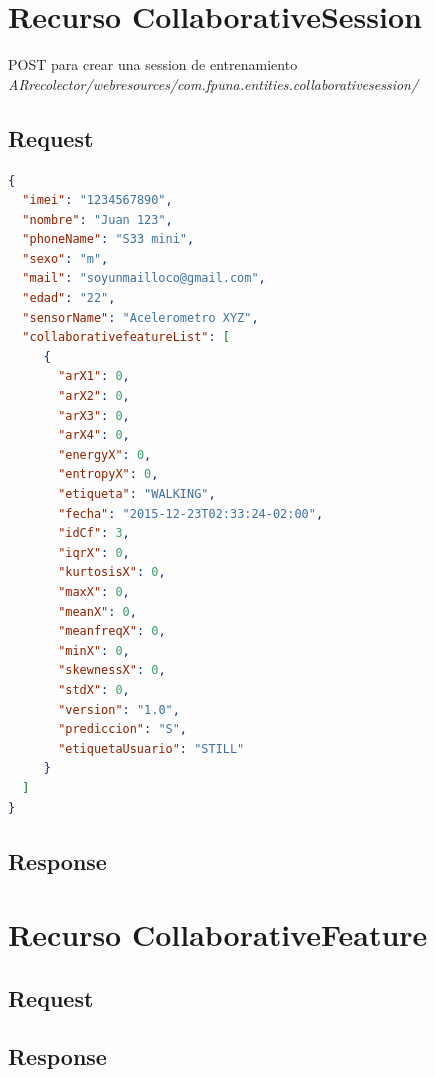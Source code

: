 \section{Recurso CollaborativeSession}

POST para crear una session de entrenamiento \textit{ARrecolector/webresources/com.fpuna.entities.collaborativesession/}

\subsection{Request}

\begin{lstlisting}[language=json,firstnumber=1]
{
  "imei": "1234567890",
  "nombre": "Juan 123",
  "phoneName": "S33 mini",
  "sexo": "m",
  "mail": "soyunmailloco@gmail.com",
  "edad": "22",
  "sensorName": "Acelerometro XYZ",
  "collaborativefeatureList": [
     {
       "arX1": 0,
       "arX2": 0,
       "arX3": 0,
       "arX4": 0,
       "energyX": 0,
       "entropyX": 0,
       "etiqueta": "WALKING",
       "fecha": "2015-12-23T02:33:24-02:00",
       "idCf": 3,
       "iqrX": 0,
       "kurtosisX": 0,
       "maxX": 0,
       "meanX": 0,
       "meanfreqX": 0,
       "minX": 0,
       "skewnessX": 0,
       "stdX": 0,
       "version": "1.0",
       "prediccion": "S",
       "etiquetaUsuario": "STILL"
     }
  ]
}
\end{lstlisting}

\subsection{Response}

\section{Recurso CollaborativeFeature}

\subsection{Request}

\subsection{Response}